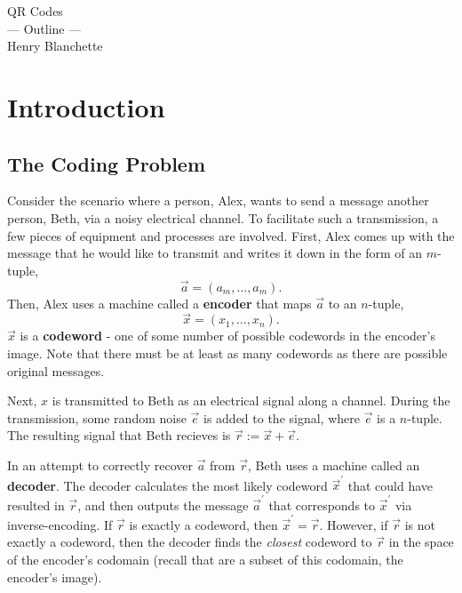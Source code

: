 \documentclass{article}
\renewcommand{\=}{\equiv}
\newcommand{\p}{^\prime}
\renewcommand{\v}{\vec}
\newcommand{\x}{{\v x}}
\theoremstyle{plain}
\theoremstyle{definition}
\begin{document}
\begin{center}
  {\huge\sc QR Codes}
  \\[2em]
  {\Large --- Outline ---}
  \\[2em]
  {\large Henry Blanchette}
\end{center}

\vspace{4em}

\tableofcontents
\newpage

\section{Introduction}

\subsection{The Coding Problem}
Consider the scenario where a person, Alex, wants to send a message another person, Beth, via a noisy electrical channel.
To facilitate such a transmission, a few pieces of equipment and processes are involved.
First, Alex comes up with the message that he would like to transmit and writes it down in the form of an $m$-tuple,
$$ \v a = (a_m, \dots, a_m). $$
Then, Alex uses a machine called a \textbf{encoder} that maps $\v a$ to an $n$-tuple,
$$ \x = (x_1, \dots, x_n). $$
$\x$ is a \textbf{codeword} - one of some number of possible codewords in the encoder's image.
Note that there must be at least as many codewords as there are possible original messages.

Next, $x$ is transmitted to Beth as an electrical signal along a channel.
During the transmission, some random noise $\v e$ is added to the signal, where $\v e$ is a $n$-tuple.
The resulting signal that Beth recieves is $\v r := \x + \v e$.

In an attempt to correctly recover $\v a$ from $\v r$, Beth uses a machine called an \textbf{decoder}.
The decoder calculates the most likely codeword $\x\p$ that could have resulted in $\v r$,
and then outputs the message $\v a\p$ that corresponds to $\x\p$ via inverse-encoding.
If $\v r$ is exactly a codeword, then $\x\p = \v r$.
However, if $\v r$ is not exactly a codeword, then the decoder finds the \textit{closest} codeword to $\v r$ in the space of the encoder's codomain (recall that are a subset of this codomain, the encoder's image).
\end{document}
